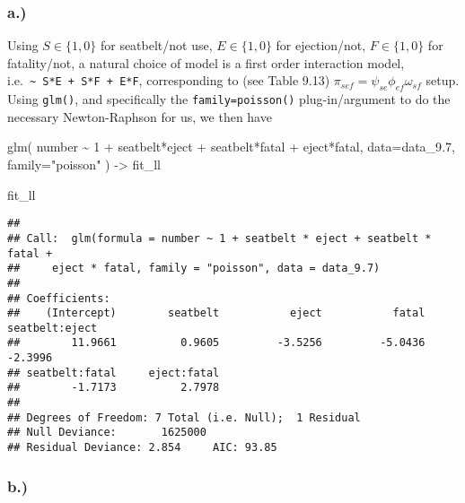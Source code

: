 \documentclass[
]{article}
\newenvironment{Shaded}{\begin{snugshade}}{\end{snugshade}}
\newcommand{\AttributeTok}[1]{\textcolor[rgb]{0.77,0.63,0.00}{#1}}
\newcommand{\DecValTok}[1]{\textcolor[rgb]{0.00,0.00,0.81}{#1}}
\newcommand{\FloatTok}[1]{\textcolor[rgb]{0.00,0.00,0.81}{#1}}
\newcommand{\FunctionTok}[1]{\textcolor[rgb]{0.00,0.00,0.00}{#1}}
\newcommand{\NormalTok}[1]{#1}
\newcommand{\OtherTok}[1]{\textcolor[rgb]{0.56,0.35,0.01}{#1}}
\newcommand{\SpecialCharTok}[1]{\textcolor[rgb]{0.00,0.00,0.00}{#1}}
\newcommand{\StringTok}[1]{\textcolor[rgb]{0.31,0.60,0.02}{#1}}
\begin{document}
\hypertarget{a.-2}{%
\subsubsection{a.)}\label{a.-2}}

Using \(S\in\{1, 0\}\) for seatbelt/not use, \(E\in\{1, 0\}\) for
ejection/not, \(F\in\{1, 0\}\) for fatality/not, a natural choice of
model is a first order interaction model,
i.e.~\texttt{\textasciitilde{}\ S*E\ +\ S*F\ +\ E*F}, corresponding to
(see Table 9.13) \(\pi_{sef} = \psi_{se}\phi_{ef} \omega_{sf}\) setup.
Using \texttt{glm()}, and specifically the \texttt{family=poisson()}
plug-in/argument to do the necessary Newton-Raphson for us, we then have

\begin{Shaded}
\begin{Highlighting}[]
\FunctionTok{glm}\NormalTok{(}
\NormalTok{  number }\SpecialCharTok{\textasciitilde{}} \DecValTok{1} \SpecialCharTok{+}\NormalTok{ seatbelt}\SpecialCharTok{*}\NormalTok{eject }\SpecialCharTok{+}\NormalTok{ seatbelt}\SpecialCharTok{*}\NormalTok{fatal }\SpecialCharTok{+}\NormalTok{ eject}\SpecialCharTok{*}\NormalTok{fatal,}
  \AttributeTok{data=}\NormalTok{data\_9}\FloatTok{.7}\NormalTok{,}
  \AttributeTok{family=}\StringTok{"poisson"}
\NormalTok{) }\OtherTok{{-}\textgreater{}}\NormalTok{ fit\_ll}

\NormalTok{fit\_ll}
\end{Highlighting}
\end{Shaded}

\begin{verbatim}
## 
## Call:  glm(formula = number ~ 1 + seatbelt * eject + seatbelt * fatal + 
##     eject * fatal, family = "poisson", data = data_9.7)
## 
## Coefficients:
##    (Intercept)        seatbelt           eject           fatal  seatbelt:eject  
##        11.9661          0.9605         -3.5256         -5.0436         -2.3996  
## seatbelt:fatal     eject:fatal  
##        -1.7173          2.7978  
## 
## Degrees of Freedom: 7 Total (i.e. Null);  1 Residual
## Null Deviance:       1625000 
## Residual Deviance: 2.854     AIC: 93.85
\end{verbatim}

\hypertarget{b.-3}{%
\subsubsection{b.)}\label{b.-3}}
\end{document}
